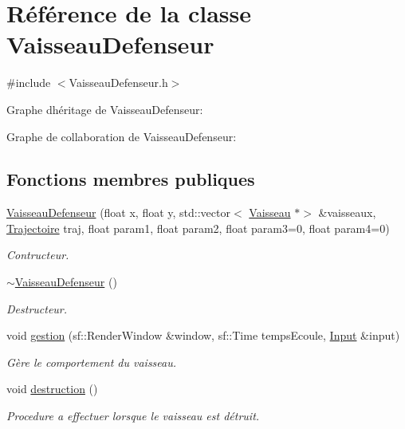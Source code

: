\hypertarget{class_vaisseau_defenseur}{}\section{Référence de la classe Vaisseau\+Defenseur}
\label{class_vaisseau_defenseur}


{\ttfamily \#include $<$Vaisseau\+Defenseur.\+h$>$}



Graphe d\textquotesingle{}héritage de Vaisseau\+Defenseur\+:


Graphe de collaboration de Vaisseau\+Defenseur\+:
\subsection*{Fonctions membres publiques}
\begin{DoxyCompactItemize}
\item 
\hyperlink{class_vaisseau_defenseur_aab85dfe4f9839ce6c3bdfafcefb62fbf}{Vaisseau\+Defenseur} (float x, float y, std\+::vector$<$ \hyperlink{class_vaisseau}{Vaisseau} $\ast$$>$ \&vaisseaux, \hyperlink{_trajectoire_8h_afa7f6e8323d7ee755d93cd1f6019dd95}{Trajectoire} traj, float param1, float param2, float param3=0, float param4=0)
\begin{DoxyCompactList}\small\item\em Contructeur. \end{DoxyCompactList}\item 
\hyperlink{class_vaisseau_defenseur_afb1098f176694c537f9a6c31da42d165}{$\sim$\+Vaisseau\+Defenseur} ()
\begin{DoxyCompactList}\small\item\em Destructeur. \end{DoxyCompactList}\item 
void \hyperlink{class_vaisseau_defenseur_adb26b3df0bb5888548ff897f23e2ec82}{gestion} (sf\+::\+Render\+Window \&window, sf\+::\+Time temps\+Ecoule, \hyperlink{_input_8h_a5588d60d674991c719a8df848313e966}{Input} \&input)
\begin{DoxyCompactList}\small\item\em Gère le comportement du vaisseau. \end{DoxyCompactList}\item 
void \hyperlink{class_vaisseau_defenseur_a6816d325d737269cddc6310e7f68b222}{destruction} ()
\begin{DoxyCompactList}\small\item\em Procedure a effectuer lorsque le vaisseau est détruit. \end{DoxyCompactList}\end{DoxyCompactItemize}
